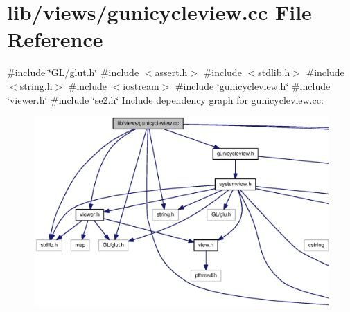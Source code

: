 \section{lib/views/gunicycleview.cc \-File \-Reference}
\label{gunicycleview_8cc}
{\ttfamily \#include \char`\"{}\-G\-L/glut.\-h\char`\"{}}\*
{\ttfamily \#include $<$assert.\-h$>$}\*
{\ttfamily \#include $<$stdlib.\-h$>$}\*
{\ttfamily \#include $<$string.\-h$>$}\*
{\ttfamily \#include $<$iostream$>$}\*
{\ttfamily \#include \char`\"{}gunicycleview.\-h\char`\"{}}\*
{\ttfamily \#include \char`\"{}viewer.\-h\char`\"{}}\*
{\ttfamily \#include \char`\"{}se2.\-h\char`\"{}}\*
\-Include dependency graph for gunicycleview.\-cc\-:\nopagebreak
\begin{figure}[H]
\begin{center}
\leavevmode
\includegraphics[width=350pt]{gunicycleview_8cc__incl}
\end{center}
\end{figure}
